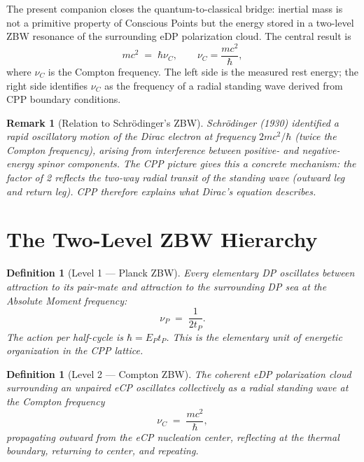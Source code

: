 \documentclass[12pt]{article}
\newtheorem{definition}[theorem]{Definition}
\newtheorem{remark}[theorem]{Remark}
\newcommand{\EP}{E_P}
\newcommand{\tP}{t_P}
\newcommand{\nuP}{\nu_P}
\newcommand{\nuC}{\nu_C}
\begin{document}
The present companion closes the quantum-to-classical bridge: inertial mass
is not a primitive property of Conscious Points but the energy stored in a
two-level ZBW resonance of the surrounding eDP polarization cloud.  The
central result is
\begin{equation}
  mc^2 \;=\; \hbar\nuC, \qquad \nuC = \frac{mc^2}{\hbar},
  \label{eq:mass-compton}
\end{equation}
where $\nuC$ is the Compton frequency.  The left side is the measured rest
energy; the right side identifies $\nuC$ as the frequency of a radial
standing wave derived from CPP boundary conditions.

\begin{remark}[Relation to Schr\"odinger's ZBW]
Schr\"odinger (1930) identified a rapid oscillatory motion of the Dirac
electron at frequency $2mc^2/\hbar$ (twice the Compton frequency), arising
from interference between positive- and negative-energy spinor components.
The CPP picture gives this a concrete mechanism: the factor of 2 reflects
the two-way radial transit of the standing wave (outward leg and return
leg).  CPP therefore explains what Dirac's equation describes.
\end{remark}

\section{The Two-Level ZBW Hierarchy}
\label{sec:hierarchy}

\begin{definition}[Level 1 --- Planck ZBW]
Every elementary DP oscillates between attraction to its pair-mate and
attraction to the surrounding DP sea at the Absolute Moment frequency:
\begin{equation}
  \nuP \;=\; \frac{1}{2\tP}.
  \label{eq:nu-planck}
\end{equation}
The action per half-cycle is $\hbar = \EP\tP$.  This is the elementary
unit of energetic organization in the CPP lattice.
\end{definition}

\begin{definition}[Level 2 --- Compton ZBW]
The coherent eDP polarization cloud surrounding an unpaired eCP oscillates
collectively as a radial standing wave at the Compton frequency
\begin{equation}
  \nuC \;=\; \frac{mc^2}{\hbar},
  \label{eq:nu-compton}
\end{equation}
propagating outward from the eCP nucleation center, reflecting at the
thermal boundary, returning to center, and repeating.
\end{definition}
\end{document}
